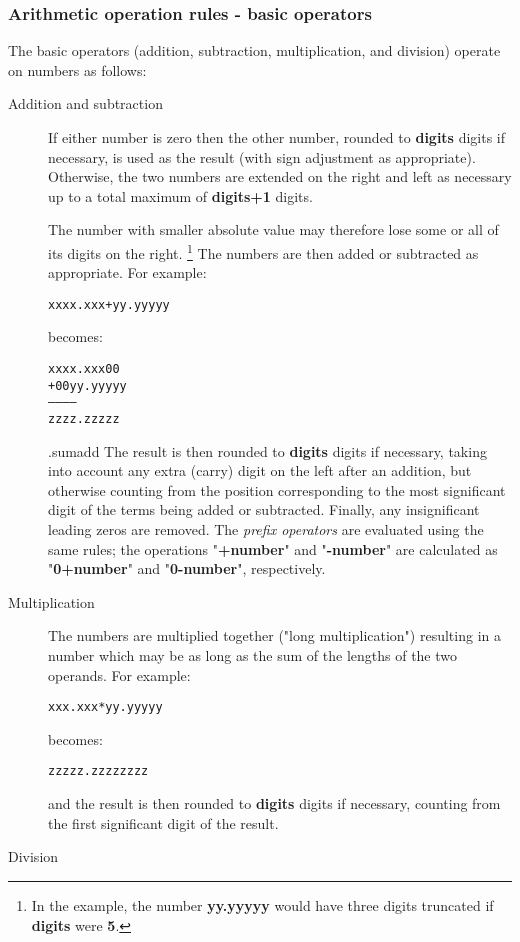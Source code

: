 \subsubsection{Arithmetic operation rules - basic operators}\label{}
 The basic operators (addition, subtraction, multiplication, and
division) operate on numbers as follows:
\begin{description}
\item[Addition and subtraction]

If either number is zero then the other number, rounded
to \textbf{digits} digits if necessary, is used as the result (with
sign adjustment as appropriate).
Otherwise, the two numbers are extended on the right and left as
necessary up to a total maximum of \textbf{digits+1} digits.
 
The number with smaller absolute value may therefore lose some or
all of its digits on the right.
\footnote{
In the example, the number \textbf{yy.yyyyy} would have three digits
truncated if \textbf{digits} were \textbf{5}.
}
The numbers are then added or subtracted as appropriate.  For example:
\begin{alltt}
xxxx.xxx + yy.yyyyy
\end{alltt}
becomes:
\begin{alltt}
  xxxx.xxx00
+ 00yy.yyyyy
------------
  zzzz.zzzzz
\end{alltt}
.sumadd
The result is then rounded to \textbf{digits} digits if necessary,
taking into account any extra (carry) digit on the left after an
addition, but otherwise counting from the position corresponding to the
most significant digit of the terms being added or subtracted.
Finally, any insignificant leading zeros are removed.
 The \emph{prefix operators} are evaluated using the same rules;
the operations "\textbf{+number}" and "\textbf{-number}"
are calculated as "\textbf{0+number}" and
"\textbf{0-number}", respectively.
\item[Multiplication]

The numbers are multiplied together ("long multiplication")
resulting in a number which may be as long as the sum of the lengths of
the two operands.  For example:
\begin{alltt}
xxx.xxx * yy.yyyyy
\end{alltt}
becomes:
\begin{alltt}
zzzzz.zzzzzzzz
\end{alltt}
and the result is then rounded to \textbf{digits} digits if
necessary, counting from the first significant digit of the result.
\item[Division]


\end{description}

